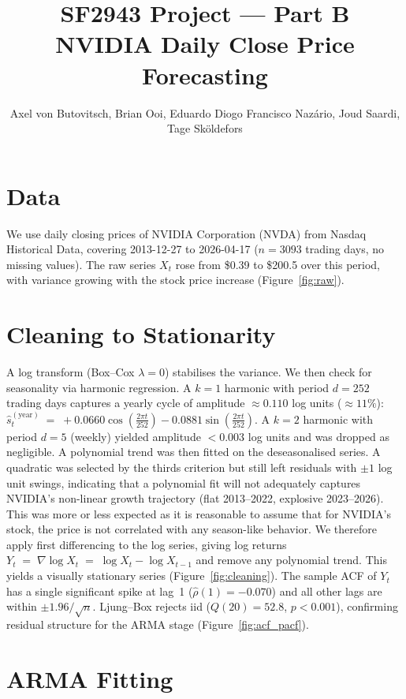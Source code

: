 \documentclass[11pt,a4paper]{article}
\title{\vspace{-2.5em}SF2943 Project --- Part B\\[1pt]
\large NVIDIA Daily Close Price Forecasting}
\author{Axel von Butovitsch, Brian Ooi, Eduardo Diogo Francisco Nazário, Joud Saardi, Tage Sköldefors}
\begin{document}
\maketitle
\vspace{-2em}

\section{Data}

We use daily closing prices of NVIDIA Corporation (NVDA) from Nasdaq Historical
Data, covering 2013-12-27 to 2026-04-17 ($n = 3093$ trading days, no missing values).
The raw series $X_t$ rose from \$0.39 to \$200.5 over this period, with variance
growing with the stock price increase (Figure~\ref{fig:raw}).

\section{Cleaning to Stationarity}

A log transform (Box--Cox $\lambda = 0$) stabilises the variance.
We then check for seasonality via harmonic regression.
A $k=1$ harmonic with period $d=252$ trading days captures a yearly cycle of
amplitude $\approx 0.110$ log units ($\approx 11\%$):
$
    \hat{s}_t^{(\text{year})} \;=\;
    +0.0660\cos\!\!\left(\tfrac{2\pi t}{252}\right)
    -0.0881\sin\!\!\left(\tfrac{2\pi t}{252}\right).
$
A $k=2$ harmonic with period $d=5$ (weekly) yielded amplitude $<0.003$ log units
and was dropped as negligible.
A polynomial trend was then fitted on the deseasonalised series. A quadratic was
selected by the thirds criterion but still left residuals with $\pm 1$ log unit
swings, indicating that a polynomial fit will not adequately captures NVIDIA's non-linear growth trajectory (flat 2013--2022, explosive 2023--2026). This was more or less expected as it is reasonable to assume that for NVIDIA's stock, the price is not correlated with any season-like behavior. We therefore apply first differencing to the log series, giving log returns $Y_t \;=\; \nabla\log X_t \;=\; \log X_t - \log X_{t-1}$ and remove any polynomial trend. This yields a visually
stationary series (Figure~\ref{fig:cleaning}).
The sample ACF of $Y_t$ has a single significant spike at lag~1
($\hat\rho(1) = -0.070$) and all other lags are within $\pm 1.96/\sqrt{n}$. 
Ljung--Box rejects iid ($Q(20)=52.8$, $p<0.001$), confirming residual structure
for the ARMA stage (Figure~\ref{fig:acf_pacf}).

\section{ARMA Fitting}
\end{document}
